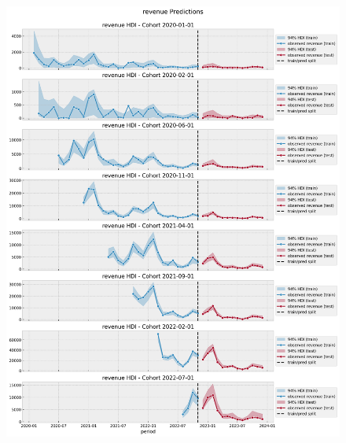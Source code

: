 \documentclass[11pt]{amsart}
\begin{document}
\begin{figure}
    \includegraphics[width=\textwidth]{images/revenue_retention_68_0.png}
\end{figure}

\clearpage

\end{document}
